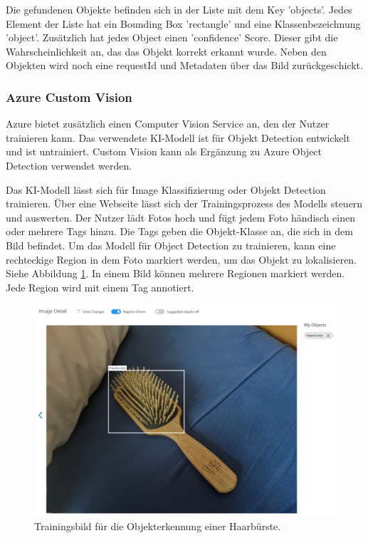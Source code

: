 Die gefundenen Objekte befinden sich in der Liste mit dem Key 'objects'. Jedes Element der Liste hat ein Bounding Box 'rectangle' und eine Klassenbezeichnung 'object'. Zusätzlich hat jedes Object einen 'confidence' Score. Dieser gibt die Wahrscheinlichkeit an, das das Objekt korrekt erkannt wurde. 
Neben den Objekten wird noch eine requestId und Metadaten über das Bild zurückgeschickt.

\subsubsection{Azure Custom Vision}
Azure bietet zusätzlich einen Computer Vision Service an, den der Nutzer trainieren kann. 
Das verwendete KI-Modell ist für Objekt Detection entwickelt und ist untrainiert.
Custom Vision kann als Ergänzung zu Azure Object Detection verwendet werden.\citep{Azure302bDoc}

Das KI-Modell lässt sich für Image Klassifizierung oder Objekt Detection trainieren. Über eine Webseite lässt sich der Trainingsprozess des Modells steuern und auswerten. Der Nutzer lädt Fotos hoch und fügt jedem Foto händisch einen oder mehrere Tags hinzu. Die Tags geben die Objekt-Klasse an, die sich in dem Bild befindet. Um das Modell für Object Detection zu trainieren, kann eine rechteckige Region in dem Foto markiert werden, um das Objekt zu lokalisieren. Siehe Abbildung \ref{img:trainingone}. In einem Bild können mehrere Regionen markiert werden. Jede Region wird mit einem Tag annotiert.

\begin{figure}[H]
	\centering
	\includegraphics[width=1\textwidth]{images/trainingone.png}
	\caption[Trainingsbild für Azrue Custom Detection]{Trainingsbild für die Objekterkennung einer Haarbürste.}
	\label{img:trainingone}
\end{figure}

